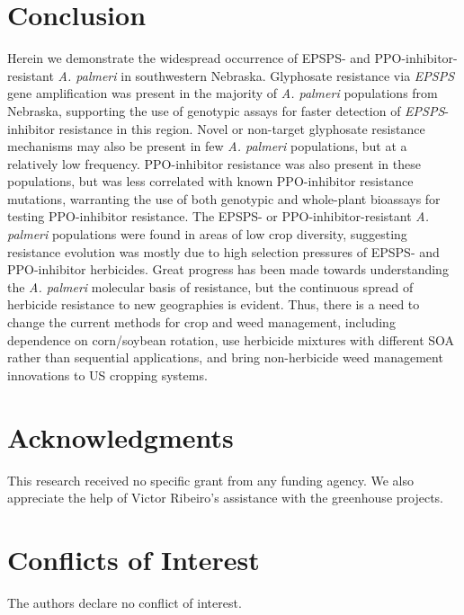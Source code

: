 \documentclass[
  12pt,
  a4paper]{article}
\begin{document}
\hypertarget{conclusion}{%
\section{Conclusion}\label{conclusion}}

Herein we demonstrate the widespread occurrence of EPSPS- and
PPO-inhibitor-resistant \emph{A. palmeri} in southwestern Nebraska.
Glyphosate resistance via \emph{EPSPS} gene amplification was present in
the majority of \emph{A. palmeri} populations from Nebraska, supporting
the use of genotypic assays for faster detection of
\emph{EPSPS}-inhibitor resistance in this region. Novel or non-target
glyphosate resistance mechanisms may also be present in few \emph{A.
palmeri} populations, but at a relatively low frequency. PPO-inhibitor
resistance was also present in these populations, but was less
correlated with known PPO-inhibitor resistance mutations, warranting the
use of both genotypic and whole-plant bioassays for testing
PPO-inhibitor resistance. The EPSPS- or PPO-inhibitor-resistant \emph{A.
palmeri} populations were found in areas of low crop diversity,
suggesting resistance evolution was mostly due to high selection
pressures of EPSPS- and PPO-inhibitor herbicides. Great progress has
been made towards understanding the \emph{A. palmeri} molecular basis of
resistance, but the continuous spread of herbicide resistance to new
geographies is evident. Thus, there is a need to change the current
methods for crop and weed management, including dependence on
corn/soybean rotation, use herbicide mixtures with different SOA rather
than sequential applications, and bring non-herbicide weed management
innovations to US cropping systems.

\hypertarget{acknowledgments}{%
\section{Acknowledgments}\label{acknowledgments}}

This research received no specific grant from any funding agency. We
also appreciate the help of Victor Ribeiro's assistance with the
greenhouse projects.

\hypertarget{conflicts-of-interest}{%
\section{Conflicts of Interest}\label{conflicts-of-interest}}

The authors declare no conflict of interest.
\end{document}
